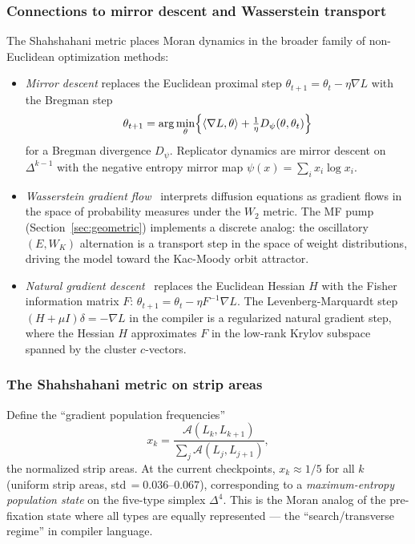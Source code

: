 \documentclass[11pt]{amsart}
\begin{document}
\subsubsection*{Connections to mirror descent and Wasserstein transport}

The Shahshahani metric places Moran dynamics in the broader family of
non-Euclidean optimization methods:
\begin{itemize}
\item \emph{Mirror descent} replaces the Euclidean proximal step
  $\theta_{t+1} = \theta_t - \eta \nabla L$ with the Bregman step
  \[
    \theta_{t+1} = \arg\min_\theta \Bigl\{
      \langle \nabla L, \theta\rangle
      + \tfrac{1}{\eta} D_\psi(\theta, \theta_t)\Bigr\}
  \]
  for a Bregman divergence $D_\psi$.
  Replicator dynamics are mirror descent on $\Delta^{k-1}$ with
  the negative entropy mirror map $\psi(x) = \sum_i x_i \log x_i$.
\item \emph{Wasserstein gradient flow}~\cite{Otto2001} interprets
  diffusion equations as gradient flows in the space of probability
  measures under the $W_2$ metric.
  The MF pump (Section~\ref{sec:geometric}) implements a discrete
  analog: the oscillatory $(E, W_K)$ alternation is a transport step
  in the space of weight distributions, driving the model toward the
  Kac-Moody orbit attractor.
\item \emph{Natural gradient descent}~\cite{Amari1998} replaces
  the Euclidean Hessian $H$ with the Fisher information matrix $F$:
  $\theta_{t+1} = \theta_t - \eta F^{-1} \nabla L$.
  The Levenberg-Marquardt step $(H + \mu I)\delta = -\nabla L$
  in the compiler is a regularized natural gradient step, where
  the Hessian $H$ approximates $F$ in the low-rank Krylov subspace
  spanned by the cluster $c$-vectors.
\end{itemize}

\subsubsection*{The Shahshahani metric on strip areas}

Define the ``gradient population frequencies''
\[
  x_k = \frac{\mathcal{A}(L_k, L_{k+1})}{\sum_j \mathcal{A}(L_j, L_{j+1})},
\]
the normalized strip areas.
At the current checkpoints, $x_k \approx 1/5$ for all $k$
(uniform strip areas, std\,$= 0.036$--$0.067$),
corresponding to a \emph{maximum-entropy population state}
on the five-type simplex $\Delta^4$.
This is the Moran analog of the pre-fixation state where all types
are equally represented --- the ``search/transverse regime'' in
compiler language.
\end{document}
